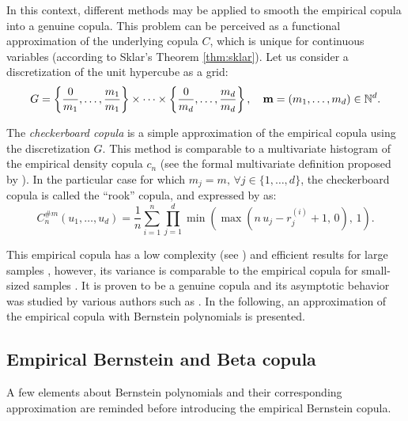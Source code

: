 In this context, different methods may be applied to smooth the empirical copula into a genuine copula. 
This problem can be perceived as a functional approximation of the underlying copula $C$, which is unique for continuous variables (according to Sklar's Theorem \ref{thm:sklar}). 
Let us consider a discretization of the unit hypercube as a grid: 
\begin{equation}
    G=\left\{\frac{0}{m_1}, \dots, \frac{m_1}{m_1}\right\} \times \dots \times \left\{\frac{0}{m_d}, \dots, \frac{m_d}{m_d}\right\}, \quad {\bf m} = (m_1, \dots, m_d) \in \mathbb{N}^d. 
\end{equation}

The \textit{checkerboard copula} is a simple approximation of the empirical copula using the discretization $G$. 
This method is comparable to a multivariate histogram of the empirical density copula $c_n$ (see the formal multivariate definition proposed by \citealt{cottin_2014_bernstein}).
In the particular case for which $m_j=m, \, \forall j \in \{1, \dots, d\}$, the checkerboard copula is called the ``rook'' copula, and expressed by \citet{segers_2017} as: 
\begin{equation}
    C_n^{\#m}(u_1, \dots, u_d) = \frac1n \sum_{i=1}^{n} \prod_{j=1}^{d} \min\left(\max(n\, u_j - r_j^{(i)} +1, \, 0), \, 1\right).
\end{equation}

This empirical copula has a low complexity (see \citealt{rose_2015}) and efficient results for large samples \citep{gonzalez_2021_checkerboard_copula}, however, its variance is comparable to the empirical copula for small-sized samples \citep{segers_2017}. 
It is proven to be a genuine copula and its asymptotic behavior was studied by various authors such as \citet{li_1998_checkerboard,genest_2017_asymptotic_checkerboard}. 
In the following, an approximation of the empirical copula with Bernstein polynomials is presented. 



\subsection{Empirical Bernstein and Beta copula}

A few elements about Bernstein polynomials and their corresponding approximation are reminded before introducing the empirical Bernstein copula.

